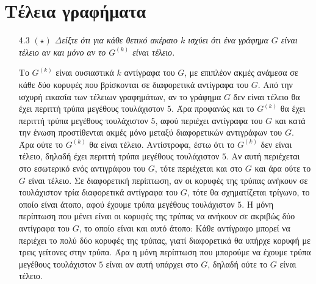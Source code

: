 \documentclass[a4paper, oneside, 11pt]{article}
\theoremstyle{definition}
\begin{document}
\section{Τέλεια γραφήματα}
\begin{enumerate}
	\item[4.3] \emph{$(\star)$ Δείξτε ότι για κάθε θετικό ακέραιο $k$ ισχύει ότι ένα γράφημα $G$ είναι τέλειο αν και μόνο αν το $G^{(k)}$ είναι τέλειο.}

Το $G^{(k)}$ είναι ουσιαστικά $k$ αντίγραφα του $G$, με επιπλέον ακμές ανάμεσα σε κάθε δύο κορυφές που βρίσκονται σε διαφορετικά αντίγραφα του $G$.
Από την ισχυρή εικασία των τέλειων γραφημάτων, αν το γράφημα $G$ δεν είναι τέλειο θα έχει περιττή τρύπα μεγέθους τουλάχιστον $5$. Άρα προφανώς και το $G^{(k)}$ θα έχει περιττή τρύπα μεγέθους τουλάχιστον
$5$, αφού περιέχει αντίγραφα του $G$ και κατά την ένωση προστίθενται ακμές μόνο μεταξύ διαφορετικών αντιγράφων του $G$. Άρα ούτε το $G^{(k)}$ θα είναι τέλειο.
Αντίστροφα, έστω ότι το $G^{(k)}$ δεν είναι τέλειο, δηλαδή έχει περιττή τρύπα μεγέθους τουλάχιστον $5$. Αν αυτή περιέχεται στο εσωτερικό ενός αντιγράφου του $G$, τότε περιέχεται και στο $G$ και άρα ούτε
το $G$ είναι τέλειο. Σε διαφορετική περίπτωση, αν οι κορυφές της τρύπας ανήκουν σε τουλάχιστον τρία διαφορετικά αντίγραφα του $G$, τότε θα σχηματίζεται τρίγωνο, το οποίο είναι άτοπο, αφού έχουμε τρύπα
μεγέθους τουλάχιστον $5$.
Η μόνη περίπτωση που μένει είναι οι κορυφές της τρύπας να ανήκουν σε ακριβώς δύο αντίγραφα του $G$, το οποίο είναι και αυτό άτοπο: Κάθε αντίγραφο μπορεί να περιέχει το πολύ δύο κορυφές της τρύπας, γιατί
διαφορετικά θα υπήρχε κορυφή με τρεις γείτονες στην τρύπα. Άρα η μόνη περίπτωση που μπορούμε να έχουμε τρύπα μεγέθους τουλάχιστον $5$ είναι αν αυτή υπάρχει στο $G$, δηλαδή ούτε το $G$ είναι τέλειο.

\end{enumerate}
\end{document}
